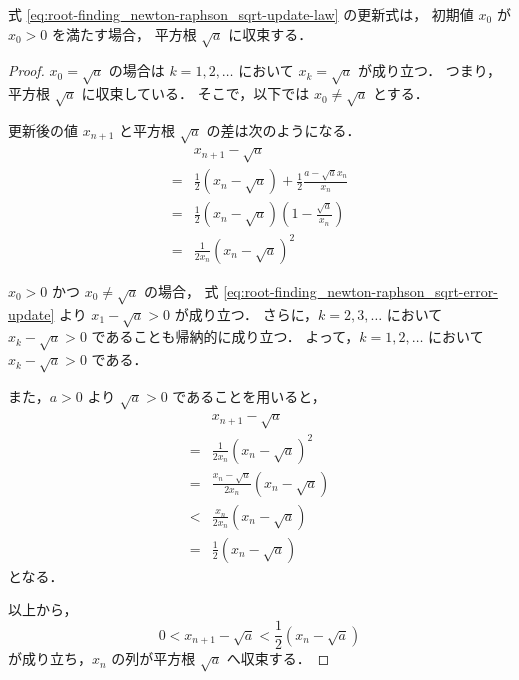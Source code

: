 \begin{theorem}
    式 \eqref{eq:root-finding_newton-raphson_sqrt-update-law} の更新式は，
    初期値 $x_0$ が $x_0 > 0$ を満たす場合，
    平方根 $\sqrt{a}$ に収束する．
\end{theorem}
\begin{proof}
    $x_0 = \sqrt{a}$ の場合は
    $k = 1, 2, \ldots$ において $x_k = \sqrt{a}$ が成り立つ．
    つまり，平方根 $\sqrt{a}$ に収束している．
    そこで，以下では $x_0 \neq \sqrt{a}$ とする．

    更新後の値 $x_{n+1}$ と平方根 $\sqrt{a}$ の差は次のようになる．
    \begin{align}
          & x_{n+1} - \sqrt{a}                                                      \\
        = & \frac{1}{2} (x_n - \sqrt{a}) + \frac{1}{2} \frac{a - \sqrt{a} x_n}{x_n} \\
        = & \frac{1}{2} (x_n - \sqrt{a}) \left(1 - \frac{\sqrt{a}}{x_n}\right)      \\
        = & \frac{1}{2x_n} (x_n - \sqrt{a})^2
        \label{eq:root-finding_newton-raphson_sqrt-error-update}
    \end{align}

    $x_0 > 0$ かつ $x_0 \neq \sqrt{a}$ の場合，
    式 \eqref{eq:root-finding_newton-raphson_sqrt-error-update} より
    $x_1 - \sqrt{a} > 0$ が成り立つ．
    さらに，$k = 2, 3, \ldots$ において $x_k - \sqrt{a} > 0$ であることも帰納的に成り立つ．
    よって，$k = 1, 2, \ldots$ において $x_k - \sqrt{a} > 0$ である．

    また，$a > 0$ より $\sqrt{a} > 0$ であることを用いると，
    \begin{align}
          & x_{n+1} - \sqrt{a}                           \\
        = & \frac{1}{2x_n} (x_n - \sqrt{a})^2            \\
        = & \frac{x_n - \sqrt{a}}{2x_n} (x_n - \sqrt{a}) \\
        < & \frac{x_n}{2x_n} (x_n - \sqrt{a})            \\
        = & \frac{1}{2} (x_n - \sqrt{a})
    \end{align}
    となる．

    以上から，
    \begin{equation}
        0 < x_{n+1} - \sqrt{a} < \frac{1}{2} (x_n - \sqrt{a})
    \end{equation}
    が成り立ち，$x_n$ の列が平方根 $\sqrt{a}$ へ収束する．
\end{proof}

